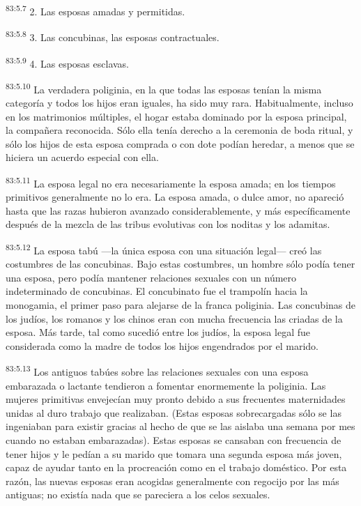 \par
\textsuperscript{83:5.7} 2. Las esposas amadas y permitidas.

\par
\textsuperscript{83:5.8} 3. Las concubinas, las esposas contractuales.

\par
\textsuperscript{83:5.9} 4. Las esposas esclavas.

\par
\textsuperscript{83:5.10} La verdadera poliginia, en la que todas las esposas tenían la misma categoría y todos los hijos eran iguales, ha sido muy rara. Habitualmente, incluso en los matrimonios múltiples, el hogar estaba dominado por la esposa principal, la compañera reconocida. Sólo ella tenía derecho a la ceremonia de boda ritual, y sólo los hijos de esta esposa comprada o con dote podían heredar, a menos que se hiciera un acuerdo especial con ella.

\par
\textsuperscript{83:5.11} La esposa legal no era necesariamente la esposa amada; en los tiempos primitivos generalmente no lo era. La esposa amada, o dulce amor, no apareció hasta que las razas hubieron avanzado considerablemente, y más específicamente después de la mezcla de las tribus evolutivas con los noditas y los adamitas.

\par
\textsuperscript{83:5.12} La esposa tabú ---la única esposa con una situación legal--- creó las costumbres de las concubinas. Bajo estas costumbres, un hombre sólo podía tener una esposa, pero podía mantener relaciones sexuales con un número indeterminado de concubinas. El concubinato fue el trampolín hacia la monogamia, el primer paso para alejarse de la franca poliginia. Las concubinas de los judíos, los romanos y los chinos eran con mucha frecuencia las criadas de la esposa. Más tarde, tal como sucedió entre los judíos, la esposa legal fue considerada como la madre de todos los hijos engendrados por el marido.

\par
\textsuperscript{83:5.13} Los antiguos tabúes sobre las relaciones sexuales con una esposa embarazada o lactante tendieron a fomentar enormemente la poliginia. Las mujeres primitivas envejecían muy pronto debido a sus frecuentes maternidades unidas al duro trabajo que realizaban. (Estas esposas sobrecargadas sólo se las ingeniaban para existir gracias al hecho de que se las aislaba una semana por mes cuando no estaban embarazadas). Estas esposas se cansaban con frecuencia de tener hijos y le pedían a su marido que tomara una segunda esposa más joven, capaz de ayudar tanto en la procreación como en el trabajo doméstico. Por esta razón, las nuevas esposas eran acogidas generalmente con regocijo por las más antiguas; no existía nada que se pareciera a los celos sexuales.

